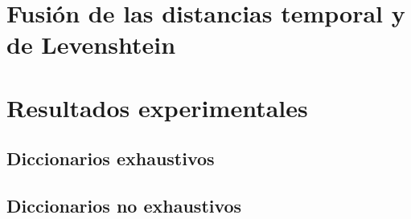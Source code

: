 \section{Fusión de las distancias temporal y de Levenshtein}
\label{sec:FusionLevenCycle}


\section{Resultados experimentales}
\label{sec:CycleResults}


\subsection{Diccionarios exhaustivos}
\label{subsec:CycDicExhaust}


\subsection{Diccionarios no exhaustivos}
\label{subsec:CycDicNoExhaust}


\endinput
